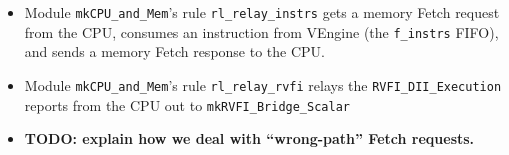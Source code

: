 \begin{frame}[fragile]
\begin{center}
\begin{minipage}{0.9\textwidth}
\begin{itemize}
    \vspace*{1ex}

    \item Module {\tt mkCPU\_and\_Mem}'s rule {\tt rl\_relay\_instrs}
      gets a memory Fetch request from the CPU, consumes an
      instruction from VEngine (the {\tt f\_instrs} FIFO), and sends a
      memory Fetch response to the CPU.

    \vspace*{1ex}

    \item Module {\tt mkCPU\_and\_Mem}'s rule {\tt rl\_relay\_rvfi}
    relays the {\tt RVFI\_DII\_Execution} reports from the CPU out to
    {\tt mkRVFI\_Bridge\_Scalar}

    \vspace*{5ex}

    \item {\bf TODO: explain how we deal with ``wrong-path'' Fetch requests.}

  \end{itemize}
 \end{minipage}
\end{center}

\end{frame}


